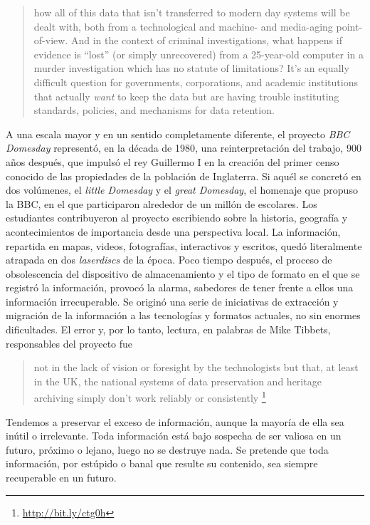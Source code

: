 \documentclass[12pt, a4paper,twoside]{book}
\begin{document}
\begin{quote}
how all of this data that isn't transferred to modern day systems
will be dealt with, both from a technological and machine- and
media-aging point-of-view. And in the context of criminal
investigations, what happens if evidence is ``lost'' (or simply
unrecovered) from a 25-year-old computer in a murder investigation
which has no statute of limitations? It's an equally difficult
question for governments, corporations, and academic institutions
that actually \emph{want} to keep the data but are having trouble
instituting standards, policies, and mechanisms for data
retention.

\end{quote}
A una escala mayor y en un sentido completamente diferente, el
proyecto \emph{BBC Domesday} representó, en la década de 1980, una
reinterpretación del trabajo, 900 años después, que impulsó el rey
Guillermo I en la creación del primer censo conocido de las
propiedades de la población de Inglaterra. Si aquél se concretó en
dos volúmenes, el \emph{little Domesday} y el
\emph{great Domesday}, el homenaje que propuso la BBC, en el que
participaron alrededor de un millón de escolares. Los estudiantes
contribuyeron al proyecto escribiendo sobre la historia, geografía
y acontecimientos de importancia desde una perspectiva local. La
información, repartida en mapas, videos, fotografías, interactivos
y escritos, quedó literalmente atrapada en dos \emph{laserdiscs} de
la época. Poco tiempo después, el proceso de obsolescencia del
dispositivo de almacenamiento y el tipo de formato en el que se
registró la información, provocó la alarma, sabedores de tener
frente a ellos una información irrecuperable. Se originó una serie
de iniciativas de extracción y migración de la información a las
tecnologías y formatos actuales, no sin enormes dificultades. El
error y, por lo tanto, lectura, en palabras de Mike Tibbets,
responsables del proyecto fue

\begin{quote}
not in the lack of vision or foresight by the technologists but
that, at least in the UK, the national systems of data preservation
and heritage archiving simply don't work reliably or consistently%
\footnote{\href{http://bit.ly/ctg0h}{http://bit.ly/ctg0h}}

\end{quote}
Tendemos a preservar el exceso de información, aunque la mayoría de
ella sea inútil o irrelevante. Toda información está bajo sospecha
de ser valiosa en un futuro, próximo o lejano, luego no se destruye
nada. Se pretende que toda información, por estúpido o banal que
resulte su contenido, sea siempre recuperable en un futuro.
\end{document}
